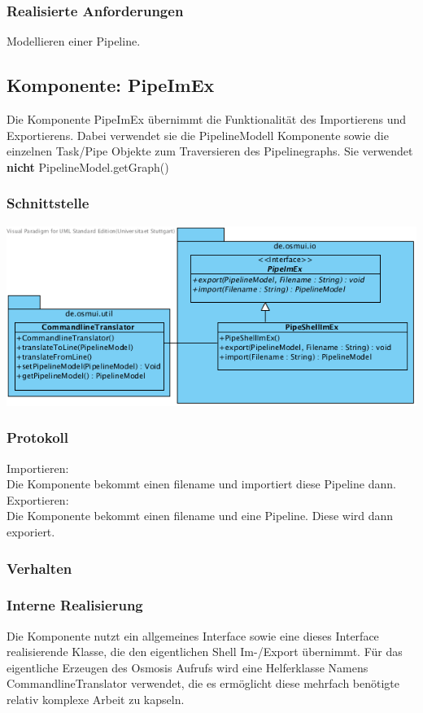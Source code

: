 \documentclass[a4paper,12pt]{scrartcl}
\begin{document}
\subsubsection{Realisierte Anforderungen}
Modellieren einer Pipeline.

\subsection{Komponente: PipeImEx}
Die Komponente PipeImEx übernimmt die Funktionalität des Importierens und Exportierens. Dabei verwendet sie die PipelineModell Komponente sowie die einzelnen Task/Pipe Objekte zum Traversieren des Pipelinegraphs. Sie verwendet \textbf{nicht} PipelineModel.getGraph()
\subsubsection{Schnittstelle}
\begin{center}
\includegraphics[width=17cm]{Schnittstelle_PipeImEx.png}
\end{center}
\subsubsection{Protokoll}
Importieren: \\
Die Komponente bekommt einen filename und importiert diese Pipeline dann.\\
Exportieren: \\
Die Komponente bekommt einen filename und eine Pipeline. Diese wird dann exporiert.
\subsubsection{Verhalten}
\subsubsection{Interne Realisierung}
Die Komponente nutzt ein allgemeines Interface sowie eine dieses Interface realisierende Klasse, die den eigentlichen Shell Im-/Export übernimmt. Für das eigentliche Erzeugen des Osmosis Aufrufs wird eine Helferklasse Namens CommandlineTranslator verwendet, die es ermöglicht diese mehrfach benötigte relativ komplexe Arbeit zu kapseln.
\end{document}
